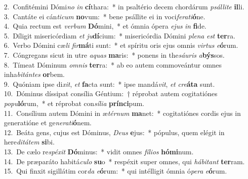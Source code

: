 {2.~}Confitémini Dómi\textit{no} \textit{in} \textbf{cí}thara:~* in psaltério decem chordárum \textit{psál}\textit{li}\textit{te} \textbf{il}li.\\
{3.~}Cantáte ei cán\textit{ti}\textit{cum} \textbf{no}vum:~* bene psállite ei in voci\textit{fe}\textit{ra}\textit{ti}\textbf{ó}ne.\\
{4.~}Quia rectum est \textit{ver}\textit{bum} \textbf{Dó}mini,~* et ómnia ópera \textit{e}\textit{jus} \textit{in} \textbf{fi}de.\\
{5.~}Díligit misericórdiam \textit{et} \textit{ju}\textbf{dí}cium:~* misericórdia Dómini \textit{ple}\textit{na} \textit{est} \textbf{ter}ra.\\
{6.~}Verbo Dómini cæ\textit{li} \textit{fir}\textbf{má}ti sunt:~* et spíritu oris ejus omnis \textit{vir}\textit{tus} \textit{e}\textbf{ó}rum.\\
{7.~}Cóngregans sicut in utre \textit{a}\textit{quas} \textbf{ma}ris:~* ponens in the\textit{sáu}\textit{ris} \textit{a}\textbf{býs}sos.\\
{8.~}Tímeat Dóminum \textit{om}\textit{nis} \textbf{ter}ra:~* ab eo autem commoveántur omnes inha\textit{bi}\textit{tán}\textit{tes} \textbf{or}bem.\\
{9.~}Quóniam ipse di\textit{xit}, \textit{et} \textbf{fa}cta sunt:~* ipse mandá\textit{vit}, \textit{et} \textit{cre}\textbf{á}\textbf{ta} sunt.\\
{10.~}Dóminus díssipat consília Géntium:~† réprobat autem cogitatiónes \textit{po}\textit{pu}\textbf{ló}rum,~* et réprobat con\textit{sí}\textit{li}\textit{a} \textbf{prín}\textbf{ci}pum.\\
{11.~}Consílium autem Dómini in æ\textit{tér}\textit{num} \textbf{ma}net:~* cogitatiónes cordis ejus in generatióne et ge\textit{ne}\textit{ra}\textit{ti}\textbf{ó}nem.\\
{12.~}Beáta gens, cujus est Dóminus, \textit{De}\textit{us} \textbf{e}jus:~* pópulus, quem elégit in here\textit{di}\textit{tá}\textit{tem} \textbf{si}bi.\\
{13.~}De cælo re\textit{spé}\textit{xit} \textbf{Dó}minus:~* vidit omnes \textit{fí}\textit{li}\textit{os} \textbf{hó}\textbf{mi}num.\\
{14.~}De præparáto habitá\textit{cu}\textit{lo} \textbf{su}o~* respéxit super omnes, qui \textit{há}\textit{bi}\textit{tant} \textbf{ter}ram.\\
{15.~}Qui finxit sigillátim cor\textit{da} \textit{e}\textbf{ó}rum:~* qui intélligit ómnia ó\textit{pe}\textit{ra} \textit{e}\textbf{ó}rum.\\
